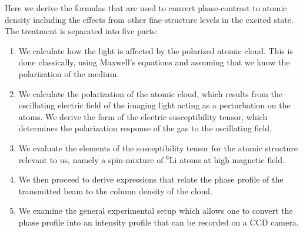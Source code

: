 Here we derive the formulas that are used to convert phase-contrast to atomic
density including the effects from other fine-structure levels in the excited
state.  The treatment is separated into five parts: \vspace{-1em}
\begin{enumerate} 
 \item  We calculate how the
light is affected by the polarized atomic cloud.  This is done classically,
using Maxwell's equations and assuming that we know the polarization of the
medium.  

 \item We calculate the polarization of the
atomic cloud, which results from the oscillating electric field of the imaging
light acting as a perturbation on the atoms. We derive the form of the electric
susceptibility tensor, which determines the polarization response of the gas to
the oscillating field.  

 \item We evaluate the elements of the susceptibility tensor for the atomic
structure relevant to us, namely a spin-mixture of $^{6}$Li atoms at high
magnetic field. 

\item  We then proceed to derive expressions that relate the phase
profile of the transmitted beam to the column density of the cloud.  

 \item We  examine the general experimental setup which allows one to convert
the phase profile into an intensity profile that can be recorded on a CCD
camera.  
\end{enumerate}
\vspace{0.5em}


